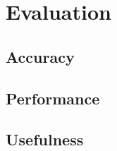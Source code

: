 \chapter{Evaluation}
\label{sec:evaluation}

\section{Accuracy}
\label{sec:accuracy}

\section{Performance}
\label{sec:performance}

\section{Usefulness}
\label{sec:usefulness}